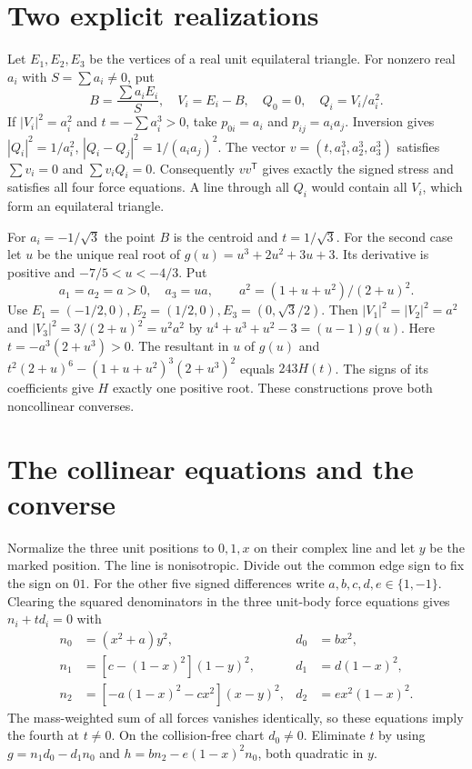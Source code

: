 \documentclass[11pt]{article}
\begin{document}
\section{Two explicit realizations}
Let $E_1,E_2,E_3$ be the vertices of a real unit equilateral triangle. For nonzero real $a_i$ with $S=\sum a_i\ne0$, put
\[
 B=\frac{\sum a_iE_i}{S},\quad V_i=E_i-B,\quad Q_0=0,\quad Q_i=V_i/a_i^2.
\]
If $|V_i|^2=a_i^2$ and $t=-\sum a_i^3>0$, take $p_{0i}=a_i$ and $p_{ij}=a_i a_j$. Inversion gives $|Q_i|^2=1/a_i^2$, $|Q_i-Q_j|^2=1/(a_i a_j)^2$. The vector $v=(t,a_1^3,a_2^3,a_3^3)$ satisfies $\sum v_i=0$ and $\sum v_i Q_i=0$. Consequently $vv^{\mathsf T}$ gives exactly the signed stress and satisfies all four force equations. A line through all $Q_i$ would contain all $V_i$, which form an equilateral triangle.

For $a_i=-1/\sqrt3$ the point $B$ is the centroid and $t=1/\sqrt3$. For the second case let $u$ be the unique real root of $g(u)=u^3+2u^2+3u+3$. Its derivative is positive and $-7/5<u<-4/3$. Put
\[
 a_1=a_2=a>0,\quad a_3=ua,\qquad a^2=(1+u+u^2)/(2+u)^2 .
\]
Use $E_1=(-1/2,0), E_2=(1/2,0), E_3=(0,\sqrt3/2)$. Then $|V_1|^2=|V_2|^2=a^2$ and $|V_3|^2=3/(2+u)^2=u^2a^2$ by $u^4+u^3+u^2-3=(u-1)g(u)$. Here $t=-a^3(2+u^3)>0$. The resultant in $u$ of $g(u)$ and $t^2(2+u)^6-(1+u+u^2)^3(2+u^3)^2$ equals $243H(t)$. The signs of its coefficients give $H$ exactly one positive root. These constructions prove both noncollinear converses.

\section{The collinear equations and the converse}
Normalize the three unit positions to $0,1,x$ on their complex line and let $y$ be the marked position. The line is nonisotropic. Divide out the common edge sign to fix the sign on $01$. For the other five signed differences write $a,b,c,d,e\in\{1,-1\}$. Clearing the squared denominators in the three unit-body force equations gives $n_i+t d_i=0$ with
\begin{align*}
 n_0&=(x^2+a)y^2, &d_0&=b x^2,\\
 n_1&=[c-(1-x)^2](1-y)^2, &d_1&=d(1-x)^2,\\
 n_2&=[-a(1-x)^2-cx^2](x-y)^2,&d_2&=e x^2(1-x)^2.
\end{align*}
The mass-weighted sum of all forces vanishes identically, so these equations imply the fourth at $t\ne0$. On the collision-free chart $d_0\ne0$. Eliminate $t$ by using $g=n_1d_0-d_1n_0$ and $h=bn_2-e(1-x)^2n_0$, both quadratic in $y$.
\end{document}
